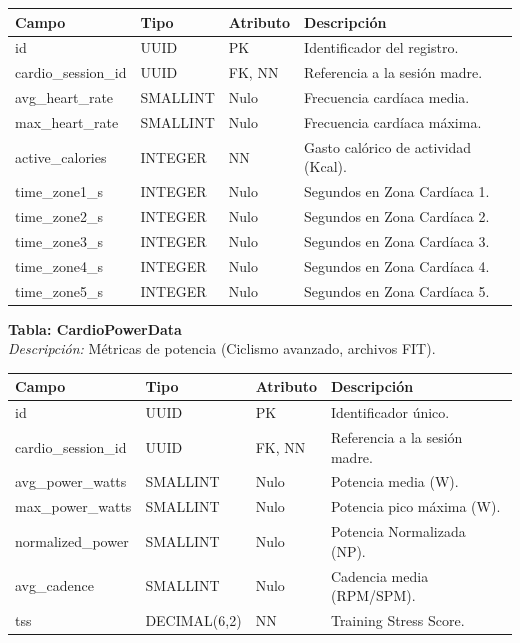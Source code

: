 \documentclass[12pt]{article}
\begin{document}
\begin{table}[h!]
    \centering
    \renewcommand{\arraystretch}{1.2}
    \small
    \begin{tabular}{|p{3.5cm}|p{2.7cm}|p{2cm}|p{6.5cm}|}
        \hline
        \rowcolor[HTML]{EFEFEF}
        \textbf{Campo} & \textbf{Tipo} & \textbf{Atributo} & \textbf{Descripción} \\ \hline
        id & UUID & PK & Identificador del registro. \\ \hline
        cardio\_session\_id & UUID & FK, NN & Referencia a la sesión madre. \\ \hline
        avg\_heart\_rate & SMALLINT & Nulo & Frecuencia cardíaca media. \\ \hline
        max\_heart\_rate & SMALLINT & Nulo & Frecuencia cardíaca máxima. \\ \hline
        active\_calories & INTEGER & NN & Gasto calórico de actividad (Kcal). \\ \hline
        time\_zone1\_s & INTEGER & Nulo & Segundos en Zona Cardíaca 1. \\ \hline
        time\_zone2\_s & INTEGER & Nulo & Segundos en Zona Cardíaca 2. \\ \hline
        time\_zone3\_s & INTEGER & Nulo & Segundos en Zona Cardíaca 3. \\ \hline
        time\_zone4\_s & INTEGER & Nulo & Segundos en Zona Cardíaca 4. \\ \hline
        time\_zone5\_s & INTEGER & Nulo & Segundos en Zona Cardíaca 5. \\ \hline
    \end{tabular}
\end{table}
\newpage
\noindent\textbf{Tabla: CardioPowerData} \\
\textit{Descripción:} Métricas de potencia (Ciclismo avanzado, archivos FIT).
\begin{table}[h!]
    \centering
    \renewcommand{\arraystretch}{1.2}
    \small
    \begin{tabular}{|p{3.5cm}|p{2.7cm}|p{2cm}|p{6.5cm}|}
        \hline
        \rowcolor[HTML]{EFEFEF}
        \textbf{Campo} & \textbf{Tipo} & \textbf{Atributo} & \textbf{Descripción} \\ \hline
        id & UUID & PK & Identificador único. \\ \hline
        cardio\_session\_id & UUID & FK, NN & Referencia a la sesión madre. \\ \hline
        avg\_power\_watts & SMALLINT & Nulo & Potencia media (W). \\ \hline
        max\_power\_watts & SMALLINT & Nulo & Potencia pico máxima (W). \\ \hline
        normalized\_power & SMALLINT & Nulo & Potencia Normalizada (NP). \\ \hline
        avg\_cadence & SMALLINT & Nulo & Cadencia media (RPM/SPM). \\ \hline
        tss & DECIMAL(6,2) & NN & Training Stress Score. \\ \hline
    \end{tabular}
\end{table}
\end{document}
